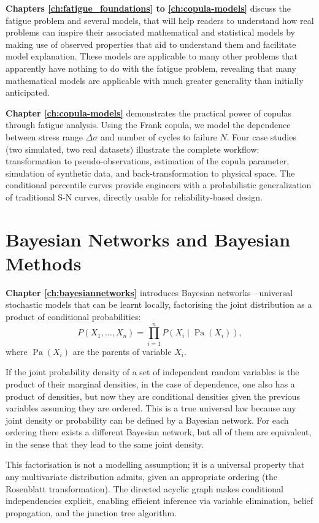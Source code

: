 \textbf{Chapters \ref{ch:fatigue_foundations} to \ref{ch:copula-models}} discuss the fatigue problem and several models, that will help readers to understand how real problems can inspire their associated mathematical and statistical models by making use of observed properties that aid to understand them and facilitate model explanation. These models are applicable to many other problems that apparently have nothing to do with the fatigue problem, revealing that many mathematical models are applicable with much greater generality than initially anticipated.

\textbf{Chapter \ref{ch:copula-models}} demonstrates the practical power of copulas through fatigue analysis. Using the Frank copula, we model the dependence between stress range \(\Delta\sigma\) and number of cycles to failure \(N\). Four case studies (two simulated, two real datasets) illustrate the complete workflow: transformation to pseudo-observations, estimation of the copula parameter, simulation of synthetic data, and back‑transformation to physical space. The conditional percentile curves provide engineers with a probabilistic generalization of traditional S-N curves, directly usable for reliability-based design.

\section{Bayesian Networks and Bayesian Methods}
\textbf{Chapter \ref{ch:bayesiannetworks}} introduces Bayesian networks—universal stochastic models that can be learnt locally, factorising the joint distribution as a product of conditional probabilities:
\[
P(X_1,\ldots,X_n) = \prod_{i=1}^{n} P(X_i\mid \operatorname{Pa}(X_i)),
\]
where $\operatorname{Pa}(X_i)$ are the parents of variable $X_i$.

If the joint probability density of a set of independent random variables is the product of their marginal densities, in the case of dependence, one also has a product of densities, but now they are conditional densities given the previous variables assuming they are ordered. This is a true universal law because any joint density or probability can be defined by a Bayesian network. For each ordering there exists a different Bayesian network, but all of them are equivalent, in the sense that they lead to the same joint density.

This factorisation is not a modelling assumption; it is a universal property that any multivariate distribution admits, given an appropriate ordering (the Rosenblatt transformation). The directed acyclic graph makes conditional independencies explicit, enabling efficient inference via variable elimination, belief propagation, and the junction tree algorithm.

